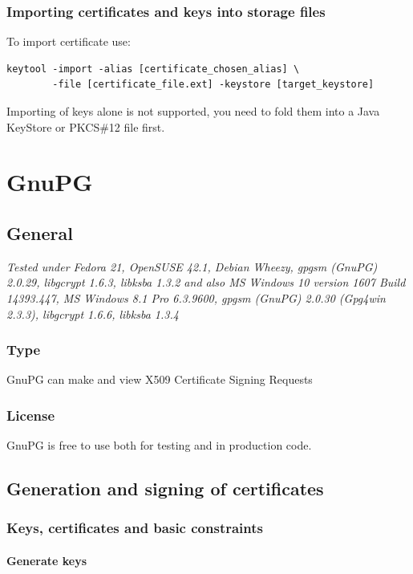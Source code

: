 \documentclass[10pt, a4paper]{report}
\begin{document}
  
  \subsection{Importing certificates and keys into storage files}
To import certificate use:
\begin{verbatim}
keytool -import -alias [certificate_chosen_alias] \
        -file [certificate_file.ext] -keystore [target_keystore]  
\end{verbatim}

Importing of keys alone is not supported, you need to fold them into a Java KeyStore or PKCS\#12 file first.



\chapter{GnuPG}

\section{General}

\textit{Tested under Fedora 21, OpenSUSE 42.1, Debian Wheezy, gpgsm (GnuPG) 2.0.29, libgcrypt 1.6.3, libksba 1.3.2 and also MS Windows 10 version 1607 Build 14393.447, MS Windows 8.1 Pro 6.3.9600, gpgsm (GnuPG) 2.0.30 (Gpg4win 2.3.3), libgcrypt 1.6.6, libksba 1.3.4}

  \subsection{Type}
GnuPG can make and view X509 Certificate Signing Requests

  \subsection{License}
GnuPG is free to use both for testing and in production code.
  
\section{Generation and signing of certificates}

  \subsection{Keys, certificates and basic constraints}
  
    \subsubsection{Generate keys}
    
\end{document}
